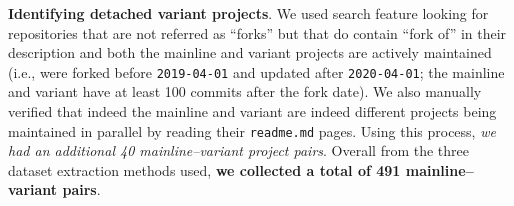 \nd \textbf{Identifying detached variant projects}. We used \gh search feature looking for repositories that are not referred as ``forks'' but that do contain ``fork of'' in their description and both the mainline and variant projects are actively maintained (i.e., were forked before \texttt{2019-04-01} and updated after \texttt{2020-04-01}; the mainline and variant have at least 100 commits after the fork date). We also manually verified that indeed the mainline and variant are indeed different projects being maintained in parallel by reading their \texttt{readme.md} pages. Using this process, \textit{we had an additional 40 mainline–variant project pairs}.
Overall from the three dataset extraction methods used, \textbf{we collected a total of 491 mainline--variant pairs}.



